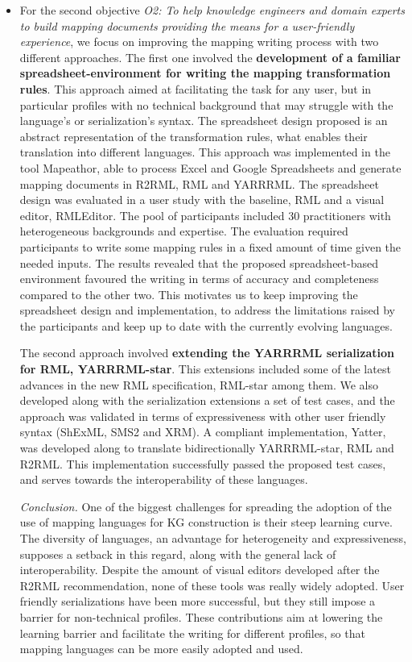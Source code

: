 \begin{itemize}
    \item For the second objective \textit{O2: To help knowledge engineers and domain experts to build mapping documents providing the means for a user-friendly experience}, we focus on improving the mapping writing process with two different approaches. 
    The first one involved the \textbf{development of a familiar spreadsheet-environment for writing the mapping transformation rules}. 
    This approach aimed at facilitating the task for any user, but in particular profiles with no technical background that may struggle with the language's or serialization's syntax. 
    The spreadsheet design proposed is an abstract representation of the transformation rules, what enables their translation into different languages. 
    This approach was implemented in the tool Mapeathor, able to process Excel and Google Spreadsheets and generate mapping documents in R2RML, RML and YARRRML. 
    The spreadsheet design was evaluated in a user study with the baseline, RML and a visual editor, RMLEditor. 
    The pool of participants included 30 practitioners with heterogeneous backgrounds and expertise.
    The evaluation required participants to write some mapping rules in a fixed amount of time given the needed inputs. 
    The results revealed that the proposed spreadsheet-based environment favoured the writing in terms of accuracy and completeness compared to the other two.
    This motivates us to keep improving the spreadsheet design and implementation, to address the limitations raised by the participants and keep up to date with the currently evolving languages. 
    
    The second approach involved \textbf{extending the YARRRML serialization for RML, YARRRML-star}. 
    This extensions included some of the latest advances in the new RML specification, RML-star among them. 
    We also developed along with the serialization extensions a set of test cases, and the approach was validated in terms of expressiveness with other user friendly syntax (ShExML, SMS2 and XRM). 
    A compliant implementation, Yatter, was developed along to translate bidirectionally YARRRML-star, RML and R2RML. 
    This implementation successfully passed the proposed test cases, and serves towards the interoperability of these languages.
    
    \textit{Conclusion.} One of the biggest challenges for spreading the adoption of the use of mapping languages for KG construction is their steep learning curve. The diversity of languages, an advantage for heterogeneity and expressiveness, supposes a setback in this regard, along with the general lack of interoperability. Despite the amount of visual editors developed after the R2RML recommendation, none of these tools was really widely adopted. User friendly serializations have been more successful, but they still impose a barrier for non-technical profiles. These contributions aim at lowering the learning barrier and facilitate the writing for different profiles, so that mapping languages can be more easily adopted and used. 
\end{itemize}


